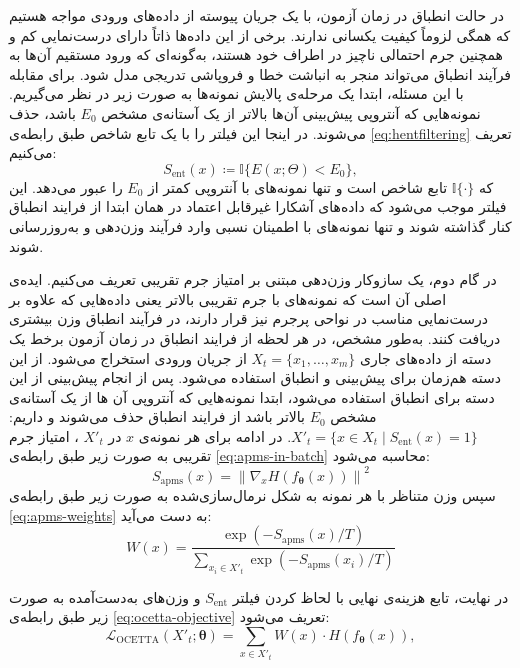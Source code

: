در حالت انطباق در زمان آزمون، با یک جریان پیوسته از داده‌های ورودی مواجه هستیم 
که همگی لزوماً کیفیت یکسانی ندارند. 
برخی از این داده‌ها ذاتاً دارای درست‌نمایی کم و همچنین جرم احتمالی ناچیز در اطراف خود هستند، 
به‌گونه‌ای که ورود مستقیم آن‌ها به فرآیند انطباق می‌تواند منجر به انباشت خطا و فروپاشی تدریجی مدل شود. 
برای مقابله با این مسئله، ابتدا یک مرحله‌ی پالایش نمونه‌ها به صورت زیر در نظر می‌گیریم.
نمونه‌هایی که آنتروپی پیش‌بینی آن‌ها بالاتر از یک آستانه‌ی مشخص $E_0$ باشد، حذف می‌شوند.  
در اینجا این فیلتر را با یک {تابع شاخص} طبق رابطه‌ی \ref{eq:hentfiltering} تعریف می‌کنیم:
\begin{equation}
	\label{eq:hentfiltering}
	S_{\mathrm{ent}}(x) \coloneqq \mathbb{I} \{ E(x; \Theta) < E_0 \},
\end{equation}
که $\mathbb{I}\{\cdot\}$ تابع شاخص است و تنها نمونه‌های با آنتروپی کمتر از $E_0$ را عبور می‌دهد.  
این فیلتر موجب می‌شود که داده‌های آشکارا غیرقابل اعتماد در همان ابتدا از فرایند انطباق کنار گذاشته شوند 
و تنها نمونه‌های با اطمینان نسبی وارد فرآیند وزن‌دهی و به‌روزرسانی شوند.  

در گام دوم، یک سازوکار وزن‌دهی مبتنی بر امتیاز جرم تقریبی تعریف می‌کنیم. 
ایده‌ی اصلی آن است که نمونه‌های با جرم تقریبی بالاتر یعنی داده‌هایی که علاوه بر درست‌نمایی مناسب در نواحی پرجرم نیز قرار دارند،
در فرآیند انطباق وزن بیشتری دریافت کنند. 
به‌طور مشخص، در هر لحظه از فرایند انطباق در زمان آزمون برخط یک دسته‌ از داده‌های جاری $X_t=\{x_1,\dots,x_m\}$ 
از جریان ورودی استخراج می‌شود. 
از این دسته هم‌زمان برای پیش‌بینی و انطباق استفاده می‌شود.
پس از انجام پیش‌بینی از این دسته برای انطباق استفاده می‌شود، ابتدا نمونه‌هایی که آنتروپی آن ها از یک آستانه‌ی مشخص $E_0$ بالاتر باشد از فرایند انطباق حذف می‌شوند و داریم:  $X'_t = \{ x \in X_t \mid S_{\mathrm{ent}}(x)=1\}$.
در ادامه برای هر نمونه‌ی $x$ در $X'_t$ ، امتیاز جرم تقریبی به صورت زیر طبق رابطه‌ی \ref{eq:apms-in-batch} محاسبه می‌شود:
\begin{equation}
	\label{eq:apms-in-batch}
	S_{\mathrm{apms}}(x) = \left\| \nabla_x H(f_{\bm\theta}(x)) \right\|^2
\end{equation}
سپس وزن متناظر با هر نمونه به شکل نرمال‌سازی‌شده به صورت زیر طبق رابطه‌ی \ref{eq:apms-weights} به دست می‌آید:
\begin{equation}
	\label{eq:apms-weights}
	W(x) =
	\dfrac{
		\exp\!\left(-S_{\mathrm{apms}}(x)/T\right)
	}{
		\sum\limits_{x_i \in X'_t}
		\exp\!\left(-S_{\mathrm{apms}}(x_i)/T\right)
	}
\end{equation}

در نهایت، تابع هزینه‌ی نهایی با لحاظ کردن فیلتر $S_{\mathrm{ent}}$ و وزن‌های به‌دست‌آمده  به صورت زیر طبق رابطه‌ی \ref{eq:ocetta-objective} تعریف می‌شود:
\begin{equation}
	\label{eq:ocetta-objective}
	\mathcal{L}_{\mathrm{OCETTA}}(X'_t;\bm\theta) = \sum_{x \in X'_t} W(x)\cdot H(f_{\bm\theta}(x)),
\end{equation}

